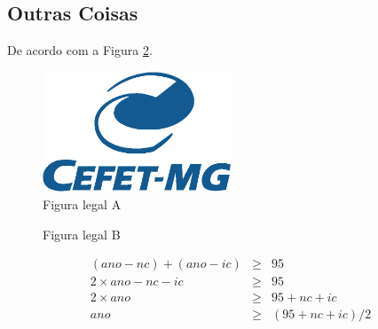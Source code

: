 \documentclass[12pt,a4paper]{article}
\begin{document}
\lipsum[1-2]

\subsection{Outras Coisas}
\lipsum[1-2]

De acordo com a Figura \ref{fig:figura2}.

\begin{figure}[h!]
\centering
\includegraphics[width=0.5\textwidth]{images/_logo}
\caption[]{Figura legal A}
\label{fig:figura1}
\end{figure}

\lipsum[1-2]

\begin{figure}[h]
  \centering
  \quad\quad
\caption[]{Figura legal B}
\label{fig:figura2}
\end{figure}

\lipsum[1-2]

\begin{eqnarray*}
(ano - nc) + (ano - ic) &\geq& 95\\
2\times ano - nc - ic  &\geq& 95\\
2\times ano &\geq& 95 + nc + ic\\
ano &\geq& (95 + nc + ic)/2
\end{eqnarray*}

\lipsum[1-2]
 

\clearpage
%
%


\end{document}
